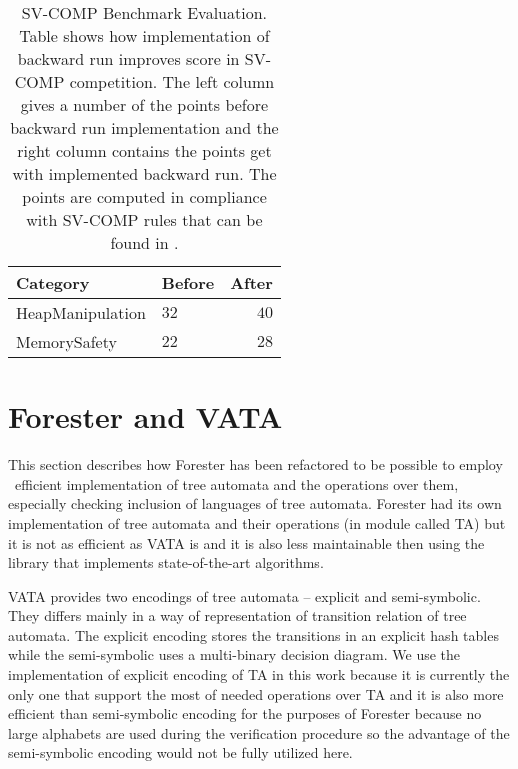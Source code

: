 \documentclass[fleqn,11pt]{ExcelAtFIT} %
\begin{document}
\begin{table}[h]
	\vskip6pt
	\caption{SV-COMP Benchmark Evaluation. Table shows how implementation of backward run improves
	score in SV-COMP competition. The left column gives a number of the points before backward run implementation 
	and the right column contains the points get with implemented backward run.
	The points are computed in compliance with SV-COMP rules that can be found in \cite{www:svcomp}.}
	\centering
	\begin{tabular}{llr}
		\toprule
		Category & Before & After \\
		\midrule
		HeapManipulation & $32$ & $40$ \\
		MemorySafety & $22$ & $28$ \\
		\bottomrule
	\end{tabular}
	\label{tab:bwres}
\end{table}


\section{Forester and VATA}
\label{sec:forvata}

This section describes how Forester has been refactored to be possible to employ \vata\ 
efficient implementation of	tree automata and the operations over them,
especially checking inclusion of languages of tree automata.
Forester had its own implementation of tree automata and their operations (in module called TA)
but it is not as efficient as VATA is and it is also less maintainable
then using the library that implements state-of-the-art algorithms.

VATA provides two encodings of tree automata -- explicit and semi-symbolic.
They differs mainly in a way of representation of transition relation of tree automata.
The explicit encoding stores the transitions in an explicit hash tables while the semi-symbolic
uses a multi-binary decision diagram.
We use the implementation of explicit encoding of TA in this work because
it is currently the only one that support the most of needed operations over TA and it is also more efficient than
semi-symbolic encoding for the purposes of Forester because no large alphabets are used during the verification procedure
so the advantage of the semi-symbolic encoding would not be fully utilized here.
\end{document}
